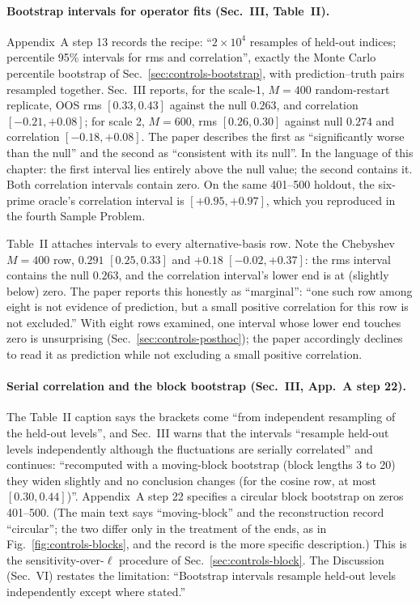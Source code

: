 \paragraph{Bootstrap intervals for operator fits (Sec.~III, Table~II).} Appendix~A step 13 records the recipe: ``$2\times10^4$ resamples of held-out indices; percentile 95\% intervals for rms and correlation'', exactly the Monte Carlo percentile bootstrap of Sec.~\ref{sec:controls-bootstrap}, with prediction--truth pairs resampled together. Sec.~III reports, for the scale-1, $M=400$ random-restart replicate, OOS rms $[0.33,0.43]$ against the null $0.263$, and correlation $[-0.21,+0.08]$; for scale 2, $M=600$, rms $[0.26,0.30]$ against null $0.274$ and correlation $[-0.18,+0.08]$. The paper describes the first as ``significantly worse than the null'' and the second as ``consistent with its null''. In the language of this chapter: the first interval lies entirely above the null value; the second contains it. Both correlation intervals contain zero. On the same 401--500 holdout, the six-prime oracle's correlation interval is $[+0.95,+0.97]$, which you reproduced in the fourth Sample Problem.

Table~II attaches intervals to every alternative-basis row. Note the Chebyshev $M=400$ row, $0.291$ $[0.25,0.33]$ and $+0.18$ $[-0.02,+0.37]$: the rms interval contains the null $0.263$, and the correlation interval's lower end is at (slightly below) zero. The paper reports this honestly as ``marginal'': ``one such row among eight is not evidence of prediction, but a small positive correlation for this row is not excluded.'' With eight rows examined, one interval whose lower end touches zero is unsurprising (Sec.~\ref{sec:controls-posthoc}); the paper accordingly declines to read it as prediction while not excluding a small positive correlation.

\paragraph{Serial correlation and the block bootstrap (Sec.~III, App.~A step 22).} The Table~II caption says the brackets come ``from independent resampling of the held-out levels'', and Sec.~III warns that the intervals ``resample held-out levels independently although the fluctuations are serially correlated'' and continues: ``recomputed with a moving-block bootstrap (block lengths 3 to 20) they widen slightly and no conclusion changes (for the cosine row, at most $[0.30,0.44]$)''. Appendix~A step 22 specifies a circular block bootstrap on zeros 401--500. (The main text says ``moving-block'' and the reconstruction record ``circular''; the two differ only in the treatment of the ends, as in Fig.~\ref{fig:controls-blocks}, and the record is the more specific description.) This is the sensitivity-over-$\ell$ procedure of Sec.~\ref{sec:controls-block}. The Discussion (Sec.~VI) restates the limitation: ``Bootstrap intervals resample held-out levels independently except where stated.''

